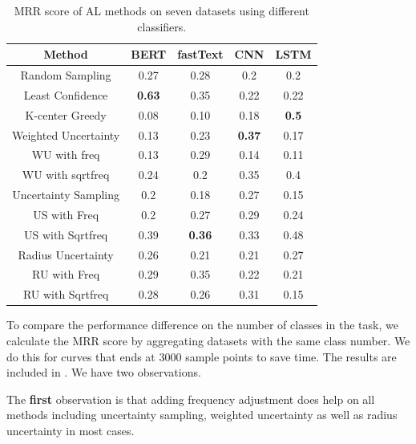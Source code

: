 \begin{table}[th]
	\centering
	\scriptsize
	\begin{tabular}{ccccc}
		\toprule
		Method & BERT & fastText & CNN & LSTM \\  \hline
		Random Sampling & 0.27 & 0.28 & 0.2 & 0.2\\
		Least Confidence & \textbf{0.63} & 0.35 & 0.22 & 0.22\\
		K-center Greedy & 0.08 & 0.10 & 0.18 & \textbf{0.5}\\ \hline
		Weighted Uncertainty & 0.13 & 0.23 & \textbf{0.37} & 0.17\\
		WU with freq & 0.13 & 0.29 & 0.14 & 0.11\\
		WU with sqrtfreq & 0.24 & 0.2 & 0.35 & 0.4\\ \hline
		Uncertainty Sampling & 0.2 & 0.18 & 0.27 & 0.15\\
		US with Freq & 0.2 & 0.27 & 0.29 & 0.24\\
		US with Sqrtfreq & 0.39 & \textbf{0.36} & 0.33 & 0.48\\ \hline
		Radius Uncertainty & 0.26 & 0.21 & 0.21 & 0.27\\
		RU with Freq & 0.29 & 0.35 & 0.22 & 0.21\\
		RU with Sqrtfreq & 0.28 & 0.26 & 0.31 & 0.15\\
		\hline
	\end{tabular}
	\caption{MRR score of AL methods on seven datasets using different classifiers.}
	\label{table:mrr}
\end{table}


To compare the performance difference on the number of classes in the task, 
we calculate the MRR score by aggregating datasets with the same class number. 
We do this for curves that ends at 3000 sample points to save time. 
The results are included in . We have two observations.



The \textbf{first} observation is that adding frequency adjustment does help on all 
methods including uncertainty sampling, weighted uncertainty as well as radius uncertainty in most cases.  

